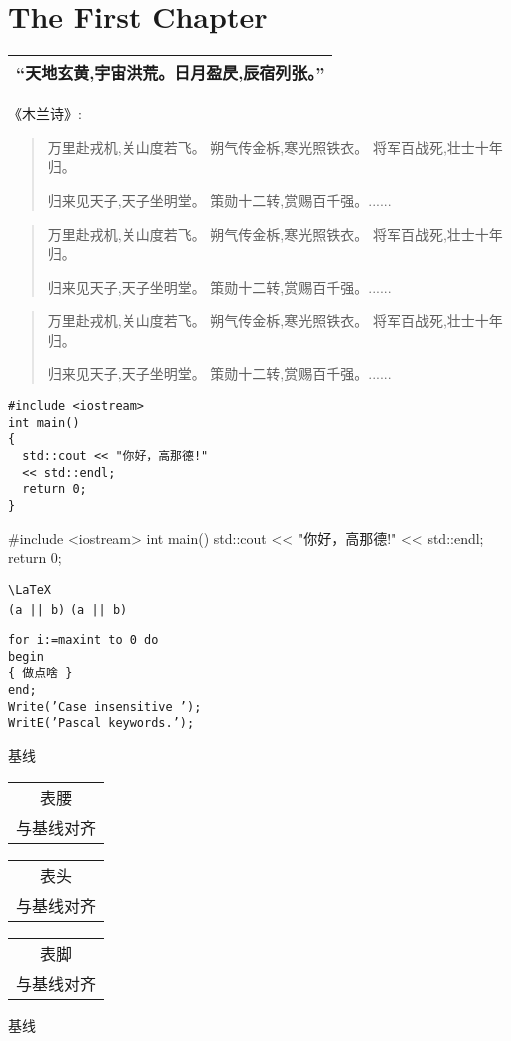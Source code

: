 \chapter{The First Chapter}

\begin{tabular}{l}
    \hline
    “天地玄黄,宇宙洪荒。日月盈昃,辰宿列张。”\footnotemark \\
    \hline
\end{tabular}
    

《木兰诗》:
\begin{quotation}
	万里赴戎机,关山度若飞。
	朔气传金柝,寒光照铁衣。
	将军百战死,壮士十年归。
	
	归来见天子,天子坐明堂。
	策勋十二转,赏赐百千强。......
\end{quotation}

\begin{quote}
	万里赴戎机,关山度若飞。
	朔气传金柝,寒光照铁衣。
	将军百战死,壮士十年归。
	
	归来见天子,天子坐明堂。
	策勋十二转,赏赐百千强。......
\end{quote}

\begin{verse}
	万里赴戎机,关山度若飞。
	朔气传金柝,寒光照铁衣。
	将军百战死,壮士十年归。
	
	归来见天子,天子坐明堂。
	策勋十二转,赏赐百千强。......
\end{verse}

\begin{verbatim}
#include <iostream>
int main()
{
  std::cout << "你好，高那德!"
  << std::endl;
  return 0;
}
\end{verbatim}

\begin{verbatim*}
#include <iostream>
int main()
{
  std::cout << "你好，高那德!"
  << std::endl;
  return 0;
}
\end{verbatim*}

\verb|\LaTeX| \\
\verb+(a || b)+ \verb*+(a || b)+


\begin{lstlisting}
for i:=maxint to 0 do
begin
{ 做点啥 }
end;
Write(’Case insensitive ’);
WritE(’Pascal keywords.’);
\end{lstlisting}


基线
\begin{tabular}{|c|}
	表腰\\
	与基线对齐\\
\end{tabular}
\begin{tabular}[t]{|c|}
	表头\\
	与基线对齐\\
\end{tabular}
\begin{tabular}[b]{|c|}
	表脚\\
	与基线对齐\\
\end{tabular}
基线\par

